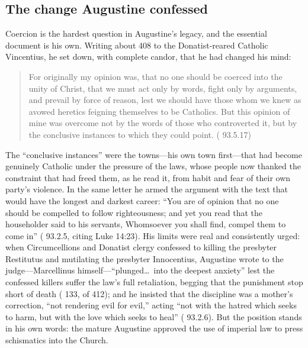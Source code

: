 \subsection{The change Augustine confessed}

Coercion is the hardest question in Augustine's legacy, and the essential
document is his own. Writing about 408 to the Donatist-reared Catholic
Vincentius, he set down, with complete candor, that he had changed his mind:

\begin{quote}
For originally my opinion was, that no one should be coerced into the unity
of Christ, that we must act only by words, fight only by arguments, and
prevail by force of reason, lest we should have those whom we knew as avowed
heretics feigning themselves to be Catholics. But this opinion of mine was
overcome not by the words of those who controverted it, but by the
conclusive instances to which they could point. ( 93.5.17)
\end{quote}

The ``conclusive instances'' were the towns---his own town first---that had
become genuinely Catholic under the pressure of the laws, whose people now
thanked the constraint that had freed them, as he read it, from habit and
fear of their own party's violence. In the same letter he armed the argument
with the text that would have the longest and darkest career: ``You are of
opinion that no one should be compelled to follow righteousness; and yet you
read that the householder said to his servants, Whomsoever you shall find,
compel them to come in'' ( 93.2.5, citing Luke 14:23). His
limits were real and consistently urged: when Circumcellions and Donatist
clergy confessed to killing the presbyter Restitutus and mutilating the
presbyter Innocentius, Augustine wrote to the judge---Marcellinus
himself---``plunged\ldots\ into the deepest anxiety'' lest the confessed
killers suffer the law's full retaliation, begging that the punishment stop
short of death ( 133, of 412); and
he insisted that the discipline was a mother's correction, ``not rendering
evil for evil,'' acting ``not with the hatred which seeks to harm, but with
the love which seeks to heal'' ( 93.2.6). But the position
stands in his own
words: the mature Augustine approved the use of imperial law to press
schismatics into the Church.

